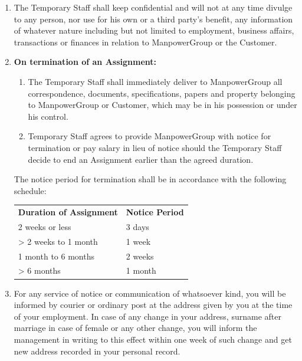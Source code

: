 \documentclass[10pt,a4paper]{article}
\begin{document}
\begin{enumerate}[leftmargin=*, label=\textbf{\arabic*.}, itemsep=4pt, start=11]

\item The Temporary Staff shall keep confidential and will not at any time divulge to any person, nor use
for his own or a third party's benefit, any information of whatever nature including but not limited to
employment, business affairs, transactions or finances in relation to ManpowerGroup or the
Customer.

\item \textbf{On termination of an Assignment:}
\begin{enumerate}[label=\textbf{(\alph*)}, itemsep=3pt, topsep=2pt]
  \item The Temporary Staff shall immediately deliver to ManpowerGroup all correspondence,
        documents, specifications, papers and property belonging to ManpowerGroup or Customer,
        which may be in his possession or under his control.
  \item Temporary Staff agrees to provide ManpowerGroup with notice for termination or pay salary
        in lieu of notice should the Temporary Staff decide to end an Assignment earlier than the agreed
        duration.
\end{enumerate}

The notice period for termination shall be in accordance with the following schedule:

\vspace{0.2cm}
\noindent\hspace{1.5em}
\begin{tabular}{@{}p{5.5cm}p{4cm}@{}}
  \textbf{Duration of Assignment} & \textbf{Notice Period} \\[3pt]
  2 weeks or less                 & 3 days \\
  > 2 weeks to 1 month            & 1 week \\
  1 month to 6 months             & 2 weeks \\
  > 6 months                      & 1 month \\
\end{tabular}
\vspace{0.2cm}

\item For any service of notice or communication of whatsoever kind, you will be informed by courier or
ordinary post at the address given by you at the time of your employment. In case of any change in
your address, surname after marriage in case of female or any other change, you will inform the
management in writing to this effect within one week of such change and get new address
recorded in your personal record.


\end{enumerate}
\end{document}
